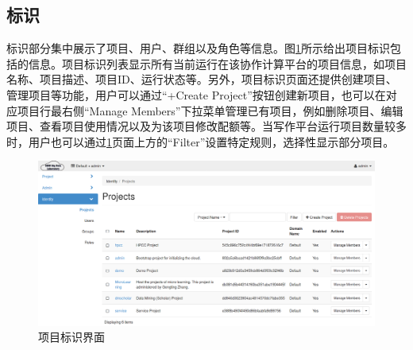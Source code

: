 \documentclass[12pt]{article}
\begin{document}
\subsection{标识}
标识部分集中展示了项目、用户、群组以及角色等信息。图\ref{fig:identityprojects}所示给出项目标识包括的信息。项目标识列表显示所有当前运行在该协作计算平台的项目信息，如项目名称、项目描述、项目ID、运行状态等。另外，项目标识页面还提供创建项目、管理项目等功能，用户可以通过“+Create Project”按钮创建新项目，也可以在对应项目行最右侧“Manage Members”下拉菜单管理已有项目，例如删除项目、编辑项目、查看项目使用情况以及为该项目修改配额等。当写作平台运行项目数量较多时，用户也可以通过\ref{fig:identityprojects}页面上方的“Filter”设置特定规则，选择性显示部分项目。
\begin{figure}[!htb]
\centering
\includegraphics[width=6in]{./figures/Identity_Projects}
\caption{项目标识界面}
\label{fig:identityprojects}
\end{figure}
\end{document}

